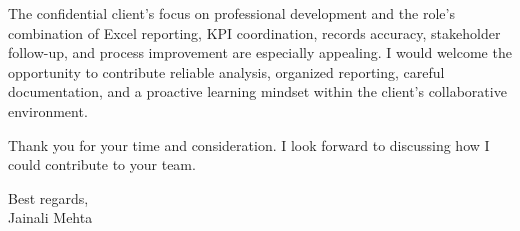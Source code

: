 \documentclass[letterpaper,11pt]{article}
\begin{document}
\bigbreak
The confidential client's focus on professional development and the role's combination of Excel reporting, KPI coordination, records accuracy, stakeholder follow-up, and process improvement are especially appealing. I would welcome the opportunity to contribute reliable analysis, organized reporting, careful documentation, and a proactive learning mindset within the client's collaborative environment.

\bigbreak
Thank you for your time and consideration. I look forward to discussing how I could contribute to your team.

\bigbreak
Best regards,\\
Jainali Mehta
\end{document}
